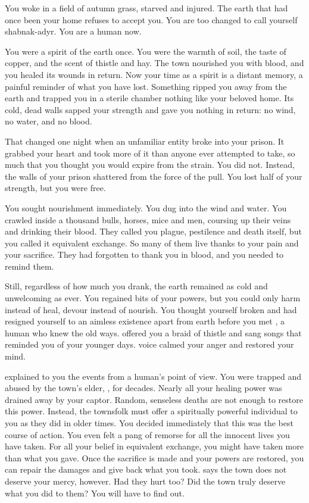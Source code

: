 \documentclass[char]{guildcamp4}
\begin{document}
\name{\cPlaguebearer{}}

You woke in a field of autumn grass, starved and injured. The earth that had once been your home refuses to accept you. You are too changed to call yourself shabnak-adyr. You are a human now.

You were a spirit of the earth once. You were the warmth of soil, the taste of copper, and the scent of thistle and hay. The town nourished you with blood, and you healed its wounds in return. Now your time as a spirit is a distant memory, a painful reminder of what you have lost. Something ripped you away from the earth and trapped you in a sterile chamber nothing like your beloved home. Its cold, dead walls sapped your strength and gave you nothing in return: no wind, no water, and no blood.

That changed one night when an unfamiliar entity broke into your prison. It grabbed your heart and took more of it than anyone ever attempted to take, so much that you thought you would expire from the strain. You did not. Instead, the walls of your prison shattered from the force of the pull. You lost half of your strength, but you were free. 

You sought nourishment immediately. You dug into the wind and water. You crawled inside a thousand bulls, horses, mice and men, coursing up their veins and drinking their blood. They called you plague, pestilence and death itself, but you called it equivalent exchange. So many of them live thanks to your pain and your sacrifice. They had forgotten to thank you in blood, and you needed to remind them.

Still, regardless of how much you drank, the earth remained as cold and unwelcoming as ever. You regained bits of your powers, but you could only harm instead of heal, devour instead of nourish. You thought yourself broken and had resigned yourself to an aimless existence apart from earth before you met \cShaman{}, a human \cShaman{\human} who knew the old ways. \cShaman{\They} offered you a braid of thistle and sang songs that reminded you of your younger days. \cShaman{\Their} voice calmed your anger and restored your mind.

\cShaman{} explained to you the events from a human's point of view. You were trapped and abused by the town's elder, \cElder{\intro}, for decades. Nearly all your healing power was drained away by your captor. Random, senseless deaths are not enough to restore this power. Instead, the townsfolk must offer a spiritually powerful individual to you as they did in older times. You decided immediately that this was the best course of action. You even felt a pang of remorse for all the innocent lives you have taken. For all your belief in equivalent exchange, you might have taken more than what you gave. Once the sacrifice is made and your powers are restored, you can repair the damages and give back what you took. \cShaman{} says the town does not deserve your mercy, however. Had they hurt \cShaman{\them} too? Did the town truly deserve what you did to them? You will have to find out.
\end{document}
